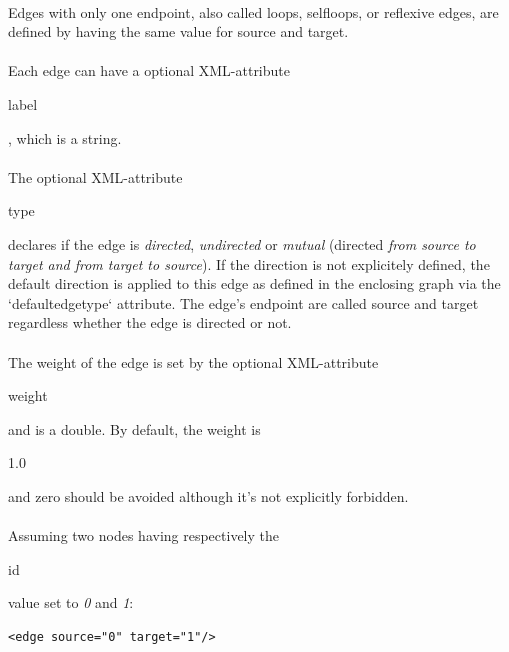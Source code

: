 \documentclass[a4paper,10pt]{article}
\begin{document}
\paragraph{}
Edges with only one endpoint, also called loops, selfloops, or reflexive edges, are defined by having the same value for source and target.

\paragraph{}
Each edge can have a optional XML-attribute \begin{footnotesize}label\end{footnotesize}, which is a string.

\paragraph{}
The optional XML-attribute \begin{footnotesize}type\end{footnotesize} declares if the edge is \textit{directed}, \textit{undirected} or \textit{mutual} (directed \textit{from source to target and from target to source}). If the direction is not explicitely defined, the default direction is applied to this edge as defined in the enclosing graph via the `defaultedgetype` attribute. The edge's endpoint are called source and target regardless whether the edge is directed or not.

\paragraph{}
The weight of the edge is set by the optional XML-attribute \begin{footnotesize}weight\end{footnotesize} and is a double. By default, the weight is \begin{footnotesize}1.0\end{footnotesize} and zero should be avoided although it's not explicitly forbidden.

\paragraph{}
Assuming two nodes having respectively the \begin{footnotesize}id\end{footnotesize} value set to \textit{0} and \textit{1}:

\lstset{ style=gexf }
\begin{lstlisting}[caption={An edge!},label=anEdge]
<edge source="0" target="1"/>
\end{lstlisting}
\end{document}

